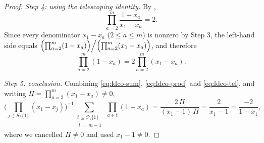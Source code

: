 \begin{proof}
\emph{Step 4: using the telescoping identity.} By ,
\[
  \prod_{a=2}^{m}\frac{1-x_a}{x_1-x_a}=2 .
\]
Since every denominator $x_1-x_a$ ($2\le a\le m$) is nonzero by Step 3, the
left-hand side equals
$\Bigl(\prod_{a=2}^{m}(1-x_a)\Bigr)\Bigl/\Bigl(\prod_{a=2}^{m}(x_1-x_a)\Bigr)$,
and therefore
\begin{equation}\label{eq:ldco-tel}
  \prod_{a=2}^{m}(1-x_a)=2\prod_{a=2}^{m}(x_1-x_a).
\end{equation}

\emph{Step 5: conclusion.} Combining \eqref{eq:ldco-sum},
\eqref{eq:ldco-prod} and \eqref{eq:ldco-tel}, and writing
$\Pi=\prod_{a=2}^{m}(x_1-x_a)\ne0$,
\[
  \Biggl(\prod_{j\in S\setminus\{1\}}(x_1-x_j)\Biggr)^{-1}
  \sum_{\substack{t\subseteq S\setminus\{1\}\\ \lvert t\rvert=m-1}}
    \ \prod_{a\in t}(1-x_a)
  =\frac{2\,\Pi}{(x_1-1)\,\Pi}
  =\frac{2}{x_1-1}
  =\frac{-2}{1-x_1},
\]
where we cancelled $\Pi\ne0$ and used $x_1-1\ne0$.
\end{proof}
